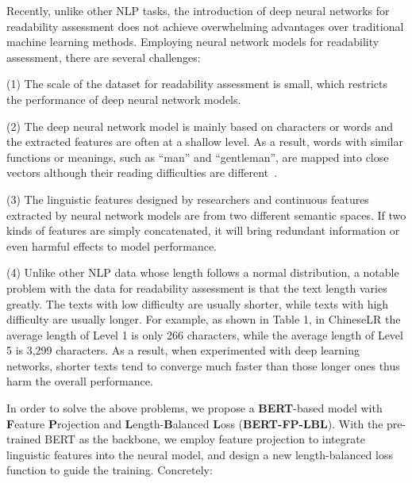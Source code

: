 \documentclass[11pt]{article}
\begin{document}
Recently, unlike other NLP tasks, the introduction of deep neural networks for readability assessment does not achieve overwhelming advantages over traditional machine learning methods.
Employing neural network models for readability assessment, there are several challenges:

(1) The scale of the dataset for readability assessment is small, which restricts the performance of deep neural network models.

(2) The deep neural network model is mainly based on characters or words and the extracted features are often at a shallow level. 
As a result, words with similar functions or meanings, such as “man” and “gentleman”, are mapped into close vectors although their reading difficulties are different~\cite{jiang2018enriching}.

(3) The linguistic features designed by researchers and continuous features extracted by neural network models are from two different semantic spaces. If two kinds of features are simply concatenated, it will bring redundant information or even harmful effects to model performance.

(4) Unlike other NLP data whose length follows a normal distribution, a notable problem with the data for readability assessment is that the text length varies greatly. The texts with low difficulty are usually shorter, while texts with high difficulty are usually longer. For example, as shown in Table 1, in ChineseLR the average length of Level 1 is only 266 characters, while the average length of Level 5 is 3,299 characters.
As a result, when experimented with deep learning networks, shorter texts tend to converge much faster than those longer ones thus harm the overall performance.


In order to solve the above problems, we propose a \textbf{BERT}-based model with \textbf{F}eature \textbf{P}rojection and \textbf{L}ength-\textbf{B}alanced \textbf{L}oss (\textbf{BERT-FP-LBL}). With the pre-trained BERT as the backbone, we employ feature projection to integrate linguistic features into the neural model, and design a new length-balanced loss function to guide the training. Concretely:
\end{document}
